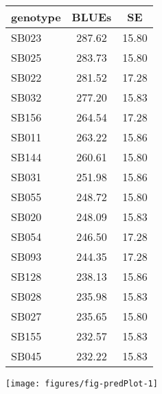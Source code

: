 \documentclass[a4paper,11pt]{article}\usepackage[]{graphicx}\usepackage[]{color}
\makeatletter
\def\maxwidth{ %
  \ifdim\Gin@nat@width>\linewidth
    \linewidth
  \else
    \Gin@nat@width
  \fi
}
\newenvironment{knitrout}{}{} %
\makeatother
\begin{document}
\begin{multicols*}{2}
\begin{tabular}{lcc}
  \hline
genotype & BLUEs & SE \\ 
  \hline
SB023 & 287.62 & 15.80 \\ 
  SB025 & 283.73 & 15.80 \\ 
  SB022 & 281.52 & 17.28 \\ 
  SB032 & 277.20 & 15.83 \\ 
  SB156 & 264.54 & 17.28 \\ 
  SB011 & 263.22 & 15.86 \\ 
  SB144 & 260.61 & 15.80 \\ 
  SB031 & 251.98 & 15.86 \\ 
  SB055 & 248.72 & 15.80 \\ 
  SB020 & 248.09 & 15.83 \\ 
  SB054 & 246.50 & 17.28 \\ 
  SB093 & 244.35 & 17.28 \\ 
  SB128 & 238.13 & 15.86 \\ 
  SB028 & 235.98 & 15.83 \\ 
  SB027 & 235.65 & 15.80 \\ 
  SB155 & 232.57 & 15.83 \\ 
  SB045 & 232.22 & 15.83 \\ 
   \hline
\end{tabular}

\columnbreak
\begin{knitrout}
\color{fgcolor}

{\centering \texttt{[image: figures/fig-predPlot-1]} 

}



\end{knitrout}
\end{multicols*}


\end{document}
